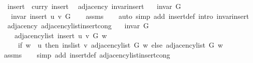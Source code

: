 \begin{isabellebody}
\ \ {\isachardoublequoteopen}insert{\isacharprime}{\kern0pt}\ {\isasymequiv}\ curry\ insert{\isachardoublequoteclose}\isanewline
\isanewline
{}\isamarkupfalse%
\ {\isacharparenleft}{\kern0pt}\ adjacency{\isacharparenright}{\kern0pt}\ invar{\isacharunderscore}{\kern0pt}insert{\isacharprime}{\kern0pt}{\isacharcolon}{\kern0pt}\isanewline
\ \ \ {\isachardoublequoteopen}invar\ G{\isachardoublequoteclose}\isanewline
\ \ \ {\isachardoublequoteopen}invar\ {\isacharparenleft}{\kern0pt}insert{\isacharprime}{\kern0pt}\ u\ v\ G{\isacharparenright}{\kern0pt}{\isachardoublequoteclose}\isanewline
%
\isadelimproof
\ \ %
\endisadelimproof
%
\isatagproof
{}\isamarkupfalse%
\ assms\isanewline
\ \ \isamarkupfalse%
\ {\isacharparenleft}{\kern0pt}auto\ simp\ add{\isacharcolon}{\kern0pt}\ insert{\isacharprime}{\kern0pt}{\isacharunderscore}{\kern0pt}def\ intro{\isacharcolon}{\kern0pt}\ invar{\isacharunderscore}{\kern0pt}insert{\isacharparenright}{\kern0pt}%
\endisatagproof
{\isafoldproof}%
%
\isadelimproof
\isanewline
%
\endisadelimproof
\isanewline
{}\isamarkupfalse%
\ {\isacharparenleft}{\kern0pt}\ adjacency{\isacharparenright}{\kern0pt}\ adjacency{\isacharunderscore}{\kern0pt}list{\isacharunderscore}{\kern0pt}insert{\isacharprime}{\kern0pt}{\isacharunderscore}{\kern0pt}cong{\isacharcolon}{\kern0pt}\isanewline
\ \ \ {\isachardoublequoteopen}invar\ G{\isachardoublequoteclose}\isanewline
\ \ \isanewline
\ \ \ \ {\isachardoublequoteopen}adjacency{\isacharunderscore}{\kern0pt}list\ {\isacharparenleft}{\kern0pt}insert{\isacharprime}{\kern0pt}\ u\ v\ G{\isacharparenright}{\kern0pt}\ w\ {\isacharequal}{\kern0pt}\isanewline
\ \ \ \ \ {\isacharparenleft}{\kern0pt}if\ w\ {\isacharequal}{\kern0pt}\ u\ then\ ins{\isacharunderscore}{\kern0pt}list\ v\ {\isacharparenleft}{\kern0pt}adjacency{\isacharunderscore}{\kern0pt}list\ G\ w{\isacharparenright}{\kern0pt}\ else\ adjacency{\isacharunderscore}{\kern0pt}list\ G\ w{\isacharparenright}{\kern0pt}{\isachardoublequoteclose}\isanewline
%
\isadelimproof
\ \ %
\endisadelimproof
%
\isatagproof
{}\isamarkupfalse%
\ assms\isanewline
\ \ \isamarkupfalse%
\ {\isacharparenleft}{\kern0pt}simp\ add{\isacharcolon}{\kern0pt}\ insert{\isacharprime}{\kern0pt}{\isacharunderscore}{\kern0pt}def\ adjacency{\isacharunderscore}{\kern0pt}list{\isacharunderscore}{\kern0pt}insert{\isacharunderscore}{\kern0pt}cong{\isacharparenright}{\kern0pt}%
\endisatagproof
{\isafoldproof}%

\end{isabellebody}
